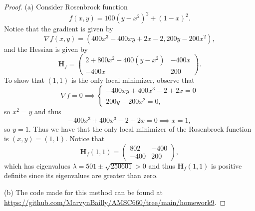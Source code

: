 \documentclass[12pt]{report}
\begin{document}
\begin{problem}
\begin{proof}
    \item [(a)] Consider Rosenbrock function
    \[
         f(x,y) = 100(y - x^2)^2 + (1-x)^2.
    \]
    Notice that the gradient is given by
    \[
         \nabla f(x,y) = (400x^3 -400xy + 2x - 2,200y-200x^2),
    \]
    and the Hessian is given by
    \[
        \mathbf{H}_f = \begin{pmatrix}
            2 + 800 x^2 - 400 (y - x^2) & -400 x \\
            -400 x & 200
        \end{pmatrix}.
    \]
    To show that $(1,1)$ is the only local minimizer, observe that
    \[
        \nabla f = 0 \implies \begin{cases}
            -400xy +400x^3 - 2+2x = 0\\
            200y - 200x^2 = 0,
        \end{cases}
    \]
    so $x^2=y$ and thus
    \[
        -400x^3 +400x^3 - 2+2x = 0 \implies x = 1,
    \]
    so $y = 1$. Thus we have that the only local minimizer of the Rosenbrock function is $(x,y) = (1,1)$. Notice that
    \[
         \mathbf{H}_f(1,1) = \begin{pmatrix}
            802 & -400 \\
            -400 & 200
        \end{pmatrix},
    \]
    which has eigenvalues $\lambda = 501 \pm \sqrt{250601} > 0$ and thus $\mathbf{H}_f(1,1)$ is positive definite since its eigenvalues are greater than zero.
    \item[(b)]
    The code made for this method can be found at \url{https://github.com/MarvynBailly/AMSC660/tree/main/homework9}. 
    

\end{proof}
\end{problem}
\end{document}
